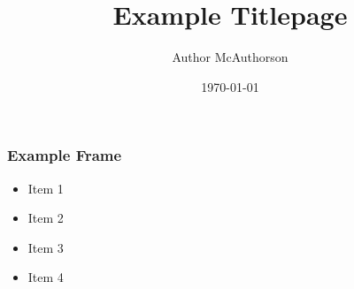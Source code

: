 \documentclass{beamer}
\title{Example Titlepage}
\author{Author McAuthorson}
\institute{University of Somewhere}
\date{\today}
\begin{document}
    \begin{frame}
        \titlepage{}
    \end{frame}

    \begin{frame}
        \frametitle{Example Frame}
        \begin{itemize}
            \item Item 1
            \item Item 2
            \item Item 3
            \item Item 4
        \end{itemize}
    \end{frame}
\end{document}
